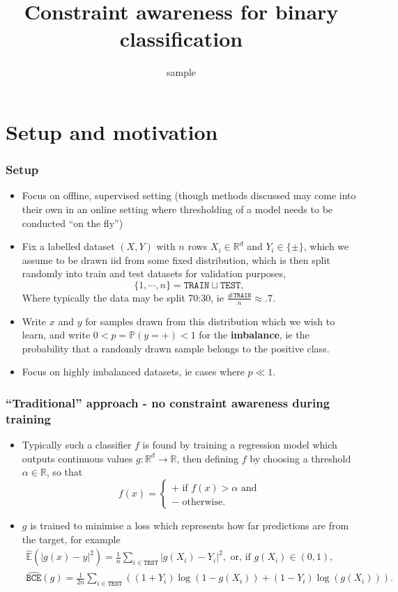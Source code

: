 \documentclass{beamer}
\title{Constraint awareness for binary classification}
\subtitle{sample}
\begin{document}
\begin{frame}
\titlepage
\end{frame}

\section{Setup and motivation}
\begin{frame}
\frametitle{Setup}
\begin{itemize}
\item
Focus on offline, supervised setting (though methods discussed may come into their own in an online setting where thresholding of a model needs to be conducted ``on the fly'')
\item
Fix a labelled dataset $(X,Y)$ with $n$ rows $X_i\in\mathbb R^d$ and $Y_i\in\{\pm\}$, which we assume to be drawn iid from some fixed distribution, which is then split randomly into train and test datasets for validation purposes,
$$
\{1,\cdots,n\}=\texttt{TRAIN}\sqcup\texttt{TEST},
$$
Where typically the data may be split 70:30, ie $\frac{\#\texttt{TRAIN}}{n}\approx.7$.
\item
Write $x$ and $y$ for samples drawn from this distribution which we wish to learn, and write $0<p=\mathbb P(y=+)<1$ for the \textbf{imbalance}, ie the probability that a randomly drawn sample belongs to the positive class.
\item
Focus on highly imbalanced datasets, ie cases where $p\ll1$. 
\end{itemize}
\end{frame}
\begin{frame}
\frametitle{``Traditional'' approach - no constraint awareness during training}
\begin{itemize}
\item
Typically such a classifier $f$ is found by training a regression model which outputs continuous values $g:\mathbb R^d\rightarrow \mathbb R$, then defining $f$ by choosing a threshold $\alpha\in\mathbb R$, so that
$$
f(x)=\begin{cases}+\text{ if }f(x)>\alpha\text{ and}\\-\text{ otherwise.}\end{cases}
$$
\item
$g$ is trained to minimise a loss which represents how far predictions are from the target, for example
\begin{gather*}
\widehat{\mathbb E}(|g(x)-y|^2)=\tfrac1n\sum_{i\in\texttt{TEST}} |g(X_i)-Y_i|^2,\text{ or, if }g(X_i)\in(0,1),\\
\widehat{\texttt{BCE}}(g)=\tfrac1{2n}\sum_{i\in\texttt{TEST}}\left((1+Y_i)\log(1-g(X_i))+(1-Y_i)\log(g(X_i))\right).
\end{gather*}
\end{itemize}
\end{frame}
\end{document}
